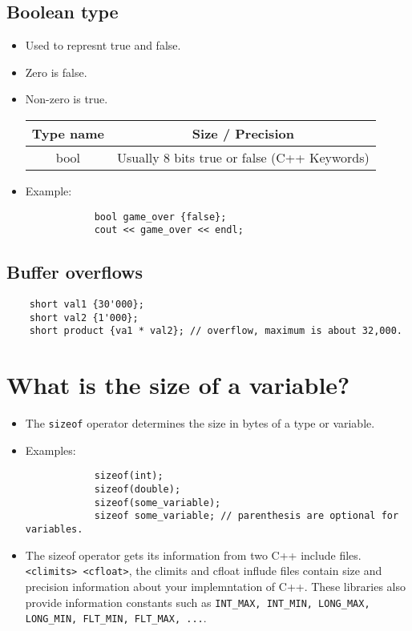 \subsection{Boolean type}
\begin{itemize}
    \item Used to represnt true and false.
    \item Zero is false. 
    \item Non-zero is true.
        \begin{center}
            \begin{tabular}{ |c|c| }
                \hline
                    Type name & Size / Precision \\
                \hline
                    bool & Usually 8 bits true or false (C++ Keywords) \\ 
                \hline
            \end{tabular}
        \end{center}

    \item Example: 
        \begin{verbatim}
            bool game_over {false};
            cout << game_over << endl;
        \end{verbatim}
\end{itemize}

\subsection{Buffer overflows}
\begin{verbatim}
    short val1 {30'000};
    short val2 {1'000};
    short product {va1 * val2}; // overflow, maximum is about 32,000.
\end{verbatim}



\section{What is the size of a variable?}
\begin{itemize}
    \item The \texttt{sizeof} operator determines the size in bytes of a type or variable.
    \item Examples: 
        \begin{verbatim}
            sizeof(int);
            sizeof(double);
            sizeof(some_variable);
            sizeof some_variable; // parenthesis are optional for variables.
        \end{verbatim}
    
    \item The sizeof operator gets its information from two C++ include files. \texttt{<climits> <cfloat>}, the climits and cfloat influde files contain size and precision information about your implemntation of C++. These libraries also provide information constants such as \verb|INT_MAX, INT_MIN, LONG_MAX, LONG_MIN, FLT_MIN, FLT_MAX, ...|.
\end{itemize}

